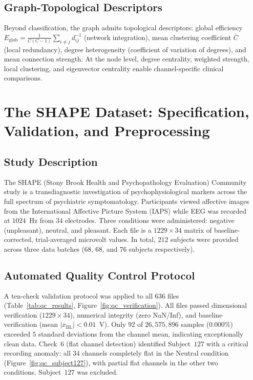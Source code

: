 \subsection{Graph-Topological Descriptors}

Beyond classification, the graph admits topological descriptors: global efficiency $E_{\text{glob}} = \frac{1}{C(C-1)} \sum_{i \neq j} d_{ij}^{-1}$ (network integration), mean clustering coefficient $\bar{C}$ (local redundancy), degree heterogeneity (coefficient of variation of degrees), and mean connection strength. At the node level, degree centrality, weighted strength, local clustering, and eigenvector centrality enable channel-specific clinical comparisons.


\section{The SHAPE Dataset: Specification, Validation, and Preprocessing}
\label{sec:ch5_dataset}

\subsection{Study Description}

The SHAPE (Stony Brook Health and Psychopathology Evaluation) Community study is a transdiagnostic investigation of psychophysiological markers across the full spectrum of psychiatric symptomatology. Participants viewed affective images from the International Affective Picture System (IAPS) \cite{lang_iaps_2008} while EEG was recorded at $1024$~Hz from $34$ electrodes. Three conditions were administered: negative (unpleasant), neutral, and pleasant. Each file is a $1229 \times 34$ matrix of baseline-corrected, trial-averaged microvolt values. In total, $212$ subjects were provided across three data batches ($68$, $68$, and $76$ subjects respectively).

\subsection{Automated Quality Control Protocol}

A ten-check validation protocol was applied to all $636$ files (Table~\ref{tab:qc_results}, Figure~\ref{fig:qc_verification}). All files passed dimensional verification ($1229 \times 34$), numerical integrity (zero NaN/Inf), and baseline verification (mean $|\overline{x}_{\text{BL}}| < 0.01$~\textmu V). Only $92$ of $26{,}575{,}896$ samples ($0.000\%$) exceeded $5$ standard deviations from the channel mean, indicating exceptionally clean data. Check~6 (flat channel detection) identified Subject~$127$ with a critical recording anomaly: all $34$ channels completely flat in the Neutral condition (Figure~\ref{fig:qc_subject127}), with partial flat channels in the other two conditions. Subject~$127$ was excluded.

